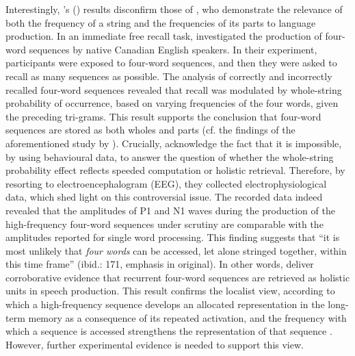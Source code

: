 Interestingly, \citeauthor{janssen-barber}'s (\citeyear{janssen-barber}) results disconfirm those of \citet{tremblay-baayen}, who demonstrate the relevance of both the frequency of a string and the frequencies of its parts to language production. In an immediate free recall task, \citet{tremblay-baayen} investigated the production of four-word sequences by native Canadian English speakers. In their experiment, participants were exposed to four-word sequences, and then they were asked to recall as many sequences as possible. The analysis of correctly and incorrectly recalled four-word sequences revealed that recall was modulated by whole-string probability of occurrence, based on varying frequencies of the four words, given the preceding tri-grams. This result supports the conclusion that four-word sequences are stored as both wholes and parts (cf. the findings of the aforementioned study by \citealt{kapatsinski-radicke}). Crucially, \citeauthor{tremblay-baayen} acknowledge the fact that it is impossible, by using behavioural data, to answer the question of whether the whole-string probability effect reflects speeded computation or holistic retrieval. Therefore, by resorting to electroencephalogram (EEG), they collected electrophysiological data, which shed light on this controversial issue. The recorded data indeed revealed that the amplitudes of P1 and N1 waves during the production of the high-frequency four-word sequences under scrutiny are comparable with the amplitudes reported for single word processing. This finding suggests that ``it is most unlikely that \textit{four words} can be accessed, let alone stringed together, within this time frame'' (ibid.: 171, emphasis in original). In other words, \citeauthor{tremblay-baayen} deliver corroborative evidence that recurrent four-word sequences are retrieved as holistic units in speech production. This result confirms the localist view, according to which a high-frequency sequence develops an allocated representation in the long-term memory as a consequence of its repeated activation, and the frequency with which a sequence is accessed strengthens the representation of that sequence \citep[cf.][]{bybee-book-2010,hay-2001,reali-christiansen,siyanova-etal}. However, further experimental evidence is needed to support this view.

